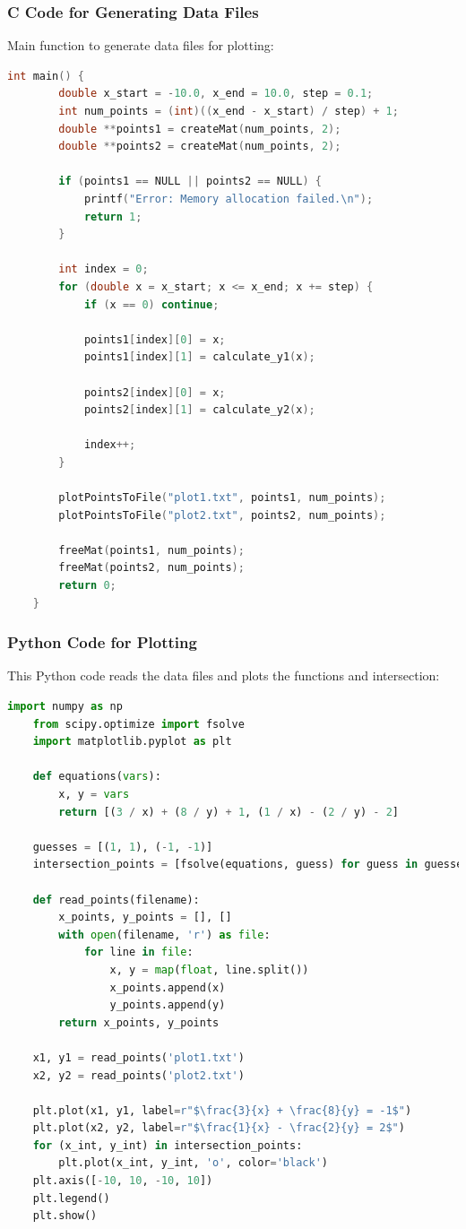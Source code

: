 \documentclass{beamer}
\begin{document}
\begin{frame}[fragile]
    \frametitle{C Code for Generating Data Files}
    Main function to generate data files for plotting:
    \begin{lstlisting}[language=C]
    int main() {
        double x_start = -10.0, x_end = 10.0, step = 0.1;
        int num_points = (int)((x_end - x_start) / step) + 1;
        double **points1 = createMat(num_points, 2);
        double **points2 = createMat(num_points, 2);
        
        if (points1 == NULL || points2 == NULL) {
            printf("Error: Memory allocation failed.\n");
            return 1;
        }

        int index = 0;
        for (double x = x_start; x <= x_end; x += step) {
            if (x == 0) continue;

            points1[index][0] = x;
            points1[index][1] = calculate_y1(x);

            points2[index][0] = x;
            points2[index][1] = calculate_y2(x);

            index++;
        }

        plotPointsToFile("plot1.txt", points1, num_points);
        plotPointsToFile("plot2.txt", points2, num_points);

        freeMat(points1, num_points);
        freeMat(points2, num_points);
        return 0;
    }
    \end{lstlisting}
\end{frame}

\begin{frame}[fragile]
    \frametitle{Python Code for Plotting}
    This Python code reads the data files and plots the functions and intersection:
    \begin{lstlisting}[language=Python]
    import numpy as np
    from scipy.optimize import fsolve
    import matplotlib.pyplot as plt

    def equations(vars):
        x, y = vars
        return [(3 / x) + (8 / y) + 1, (1 / x) - (2 / y) - 2]

    guesses = [(1, 1), (-1, -1)]
    intersection_points = [fsolve(equations, guess) for guess in guesses]

    def read_points(filename):
        x_points, y_points = [], []
        with open(filename, 'r') as file:
            for line in file:
                x, y = map(float, line.split())
                x_points.append(x)
                y_points.append(y)
        return x_points, y_points

    x1, y1 = read_points('plot1.txt')
    x2, y2 = read_points('plot2.txt')

    plt.plot(x1, y1, label=r"$\frac{3}{x} + \frac{8}{y} = -1$")
    plt.plot(x2, y2, label=r"$\frac{1}{x} - \frac{2}{y} = 2$")
    for (x_int, y_int) in intersection_points:
        plt.plot(x_int, y_int, 'o', color='black')
    plt.axis([-10, 10, -10, 10])
    plt.legend()
    plt.show()
    \end{lstlisting}
\end{frame}
\end{document}
